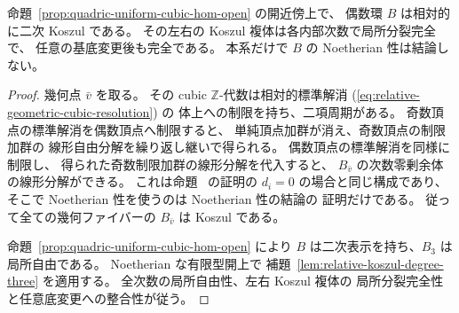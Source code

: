 \begin{corollary}
\label{cor:quadric-uniform-even-koszul}
命題~\ref{prop:quadric-uniform-cubic-hom-open} の開近傍上で、
偶数環 $B$ は相対的に二次 Koszul である。
その左右の Koszul 複体は各内部次数で局所分裂完全で、
任意の基底変更後も完全である。
本系だけで $B$ の Noetherian 性は結論しない。
\end{corollary}
\begin{proof}
幾何点 $\bar v$ を取る。
その cubic $\mathbb Z$-代数は相対的標準解消
(\ref{eq:relative-geometric-cubic-resolution}) の
体上への制限を持ち、二項周期がある。
奇数頂点の標準解消を偶数頂点へ制限すると、
単純頂点加群が消え、奇数頂点の制限加群の
線形自由分解を繰り返し継いで得られる。
偶数頂点の標準解消を同様に制限し、
得られた奇数制限加群の線形分解を代入すると、
$B_{\bar v}$ の次数零剰余体の線形分解ができる。
これは命題~\cite[\texttt{prop:weighted-even-koszul}]{QuadricIntrinsic2026} の証明の
$d_i=0$ の場合と同じ構成であり、
そこで Noetherian 性を使うのは Noetherian 性の結論の
証明だけである。
従って全ての幾何ファイバーの $B_{\bar v}$ は Koszul である。

命題~\ref{prop:quadric-uniform-cubic-hom-open} により
$B$ は二次表示を持ち、$B_3$ は局所自由である。
Noetherian な有限型開上で
補題~\ref{lem:relative-koszul-degree-three} を適用する。
全次数の局所自由性、左右 Koszul 複体の
局所分裂完全性と任意底変更への整合性が従う。
\end{proof}


